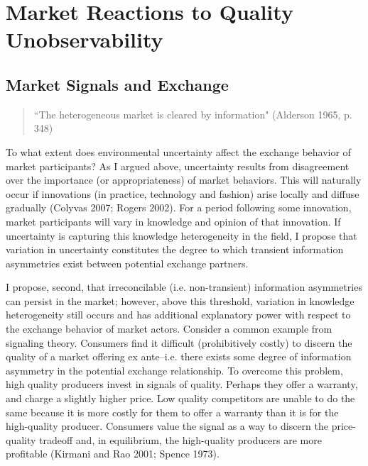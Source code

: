\chapter{Market Reactions to Quality Unobservability \label{signal}}


\section{Market Signals and Exchange}

\begin{small}
\begin{quote}
``The heterogeneous market is cleared by information" (Alderson 1965, p. 348)
\end{quote}
\end{small}

To what extent does environmental uncertainty affect the exchange behavior of market participants?  As I argued above, uncertainty results from disagreement over the importance (or appropriateness) of market behaviors. This will naturally occur if innovations (in practice, technology and fashion) arise locally and diffuse gradually (Colyvas 2007; Rogers 2002). For a period following some innovation, market participants will vary in knowledge and opinion of that innovation. If uncertainty is capturing this knowledge heterogeneity in the field, I propose that variation in uncertainty constitutes the degree to which transient information asymmetries exist between potential exchange partners. 

I propose, second, that irreconcilable (i.e. non-transient) information asymmetries can persist in the market; however, above this threshold, variation in knowledge heterogeneity still occurs and has additional explanatory power with respect to the exchange behavior of market actors. Consider a common example from signaling theory. Consumers find it difficult (prohibitively costly) to discern the quality of a market offering ex ante--i.e. there exists some degree of information asymmetry in the potential exchange relationship. To overcome this problem, high quality producers invest in signals of quality. Perhaps they offer a warranty, and charge a slightly higher price. Low quality competitors are unable to do the same because it is more costly for them to offer a warranty than it is for the high-quality producer. Consumers value the signal as a way to discern the price-quality tradeoff and, in equilibrium, the high-quality producers are more profitable (Kirmani and Rao 2001; Spence 1973).

